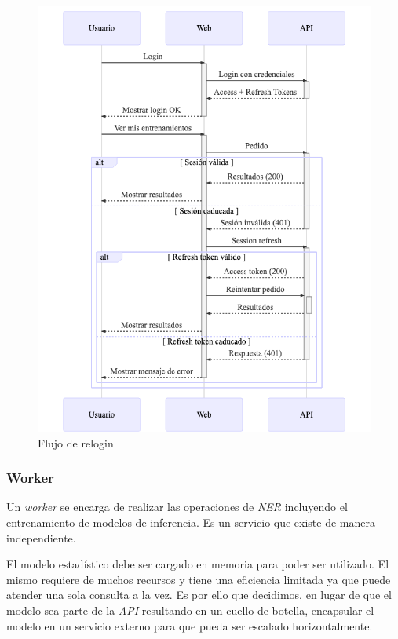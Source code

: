 \documentclass[12pt,a4paper,]{scrartcl}
\begin{document}
\begin{figure}[H]

{\centering \includegraphics{assets/mermaid/scenarios-relogin.png} 

}

\caption{Flujo de relogin}\label{fig:scenarios-relogin}
\end{figure}

\hypertarget{worker}{%
\subsubsection{Worker}\label{worker}}

Un \emph{worker} se encarga de realizar las operaciones de \emph{NER} incluyendo el entrenamiento de modelos de inferencia. Es un servicio que existe de manera independiente.

El modelo estadístico debe ser cargado en memoria para poder ser utilizado. El mismo requiere de muchos recursos y tiene una eficiencia limitada ya que puede atender una sola consulta a la vez. Es por ello que decidimos, en lugar de que el modelo sea parte de la \emph{API} resultando en un cuello de botella, encapsular el modelo en un servicio externo para que pueda ser escalado horizontalmente.
\end{document}
